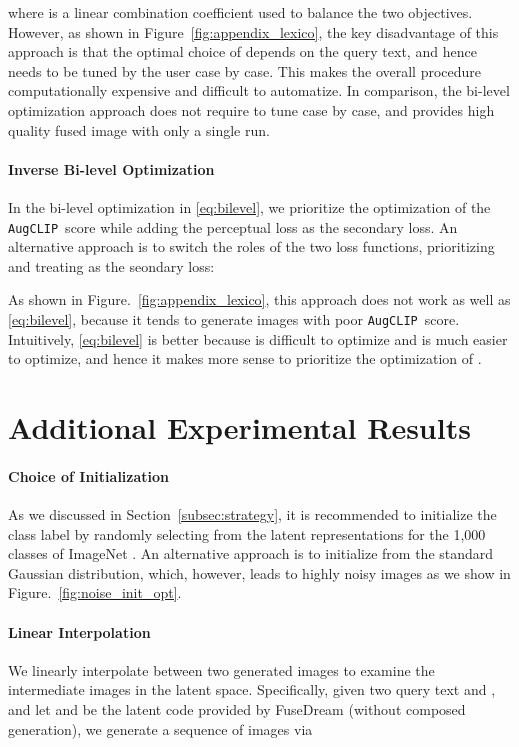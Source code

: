 \documentclass[10pt,twocolumn,letterpaper]{article}
\newcommand{\ourloss}{\texttt{AugCLIP}}
\begin{document}
where  is a linear combination coefficient used to balance the two objectives. 
However, as shown in Figure~\ref{fig:appendix_lexico}, 
the key disadvantage of this approach is that  
the optimal choice of  depends on 
the query text, and hence needs to be tuned by the user 
case by case. This makes the overall procedure  computationally expensive and difficult to automatize.  
In comparison, the bi-level optimization approach does not require to tune  case by case, and provides 
high quality fused image with only a single run. 


\paragraph{Inverse Bi-level Optimization}In the bi-level optimization in \eqref{eq:bilevel}, 
we prioritize the optimization of the 
 \ourloss~score  while adding the perceptual loss    as the secondary loss. 
 An alternative approach is to switch the roles of the two loss functions, 
prioritizing   and treating  as the seondary loss: 

As shown in Figure.~\ref{fig:appendix_lexico},
this approach does not work as well as  \eqref{eq:bilevel}, 
because it tends to generate images with poor \ourloss~score. 
Intuitively, \eqref{eq:bilevel} is better because 
 is difficult to optimize and  
 is much easier to optimize, and hence it makes more sense to prioritize the optimization of . 
\vspace{.5\baselineskip}



\section{Additional Experimental Results}

\paragraph{Choice of Initialization} As we discussed in  Section~\ref{subsec:strategy}, 
it is recommended to initialize the class label  by randomly selecting from the latent representations for the 1,000 classes of ImageNet 
. 
An alternative approach is to initialize  from the standard Gaussian distribution, 
which, however, leads to highly noisy images as we show in Figure.~\ref{fig:noise_init_opt}. 
\vspace{.5\baselineskip}

\paragraph{Linear Interpolation} We linearly interpolate between two generated images to examine the intermediate images in the latent space.
Specifically, 
given two query text  and , 
and let  and  be the latent code provided by FuseDream (without composed generation), 
 we generate a sequence of images via 
 
\end{document}
